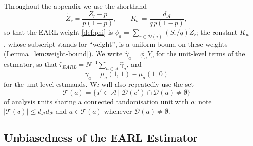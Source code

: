 \documentclass[sigconf,nonacm]{acmart}
\begin{document}
Throughout the appendix we use the shorthand
\begin{equation}\label{def:Kw}
    \tilde Z_r = \frac{Z_r-p}{p(1-p)},\qquad
    K_w = \frac{d_{\mathcal A}}{q\,p(1-p)},
\end{equation}
so that the EARL weight \eqref{def:phi} is $\phi_a = \sum_{r\in\mathcal D(a)}(S_r/q)\tilde Z_r$; the constant $K_w$, whose subscript stands for ``weight'', is a uniform bound on these weights (Lemma~\ref{lem:weight-bound}). We write $\hat\gamma_a=\phi_aY_a$ for the unit-level terms of the estimator, so that $\hat\tau_{EARL}=N^{-1}\sum_{a\in\mathcal A}\hat\gamma_a$, and
\begin{equation}\label{def:gamma-a}
    \gamma_a = \mu_a(1,\,1) - \mu_a(1,\,0)
\end{equation}
for the unit-level estimands. We will also repeatedly use the set
\begin{equation*}
    \mathcal T(a) = \{a'\in\mathcal A\mid \mathcal D(a')\cap \mathcal D(a) \neq \emptyset\}
\end{equation*}
of analysis units sharing a connected randomisation unit with $a$; note $|\mathcal T(a)|\le d_{\mathcal A}d_{\mathcal R}$ and $a\in\mathcal T(a)$ whenever $\mathcal D(a)\neq\emptyset$.

\subsection{Unbiasedness of the EARL Estimator}
\end{document}
